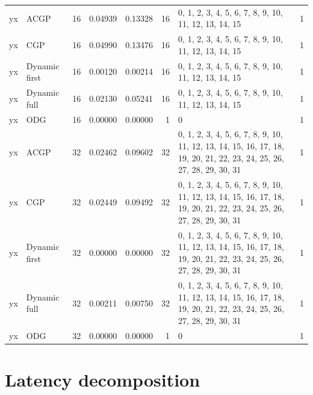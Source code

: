 \documentclass[10pt,a4paper]{article}
\begin{document}
\begin{longtable}{@{}p{23mm}p{29mm}rrrrp{36mm}r@{}}
yx & ACGP & 16 & 0.04939 & 0.13328 & 16 & 0, 1, 2, 3, 4, 5, 6, 7, 8, 9, 10, 11, 12, 13, 14, 15 & 1 \\
yx & CGP & 16 & 0.04990 & 0.13476 & 16 & 0, 1, 2, 3, 4, 5, 6, 7, 8, 9, 10, 11, 12, 13, 14, 15 & 1 \\
yx & Dynamic first & 16 & 0.00120 & 0.00214 & 16 & 0, 1, 2, 3, 4, 5, 6, 7, 8, 9, 10, 11, 12, 13, 14, 15 & 1 \\
yx & Dynamic full & 16 & 0.02130 & 0.05241 & 16 & 0, 1, 2, 3, 4, 5, 6, 7, 8, 9, 10, 11, 12, 13, 14, 15 & 1 \\
yx & ODG & 16 & 0.00000 & 0.00000 & 1 & 0 & 1 \\
yx & ACGP & 32 & 0.02462 & 0.09602 & 32 & 0, 1, 2, 3, 4, 5, 6, 7, 8, 9, 10, 11, 12, 13, 14, 15, 16, 17, 18, 19, 20, 21, 22, 23, 24, 25, 26, 27, 28, 29, 30, 31 & 1 \\
yx & CGP & 32 & 0.02449 & 0.09492 & 32 & 0, 1, 2, 3, 4, 5, 6, 7, 8, 9, 10, 11, 12, 13, 14, 15, 16, 17, 18, 19, 20, 21, 22, 23, 24, 25, 26, 27, 28, 29, 30, 31 & 1 \\
yx & Dynamic first & 32 & 0.00000 & 0.00000 & 32 & 0, 1, 2, 3, 4, 5, 6, 7, 8, 9, 10, 11, 12, 13, 14, 15, 16, 17, 18, 19, 20, 21, 22, 23, 24, 25, 26, 27, 28, 29, 30, 31 & 1 \\
yx & Dynamic full & 32 & 0.00211 & 0.00750 & 32 & 0, 1, 2, 3, 4, 5, 6, 7, 8, 9, 10, 11, 12, 13, 14, 15, 16, 17, 18, 19, 20, 21, 22, 23, 24, 25, 26, 27, 28, 29, 30, 31 & 1 \\
yx & ODG & 32 & 0.00000 & 0.00000 & 1 & 0 & 1 \\
\end{longtable}\normalsize\setlength{\tabcolsep}{6pt}
\clearpage
\section*{Latency decomposition}
\clearpage
\end{document}
